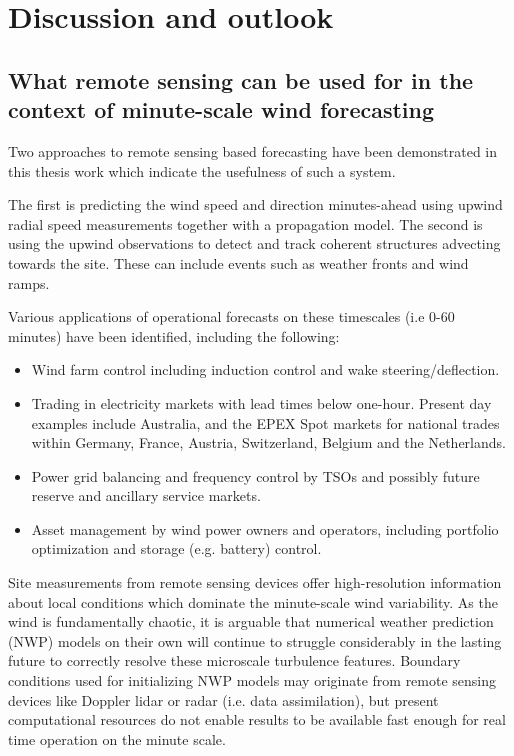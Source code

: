 \chapter{Discussion and outlook}
\label{sec:discussion}

\clearpage
\section{What remote sensing can be used for in the context of minute-scale wind forecasting}
\label{sec:discussion_rs}
\bigskip

Two approaches to remote sensing based forecasting have been demonstrated in this thesis work which indicate the usefulness of such a system.

The first is predicting the wind speed and direction minutes-ahead using upwind radial speed measurements together with a propagation model. The second is using the upwind observations to detect and track coherent structures advecting towards the site. These can include events such as weather fronts and wind ramps.

Various applications of operational forecasts on these timescales (i.e 0-60 minutes) have been identified, including the following:

\begin{itemize}
    \item Wind farm control including induction control and wake steering/deflection.
    \item Trading in electricity markets with lead times below one-hour. Present day examples include Australia, and the EPEX Spot markets for national trades within Germany, France, Austria, Switzerland, Belgium and the Netherlands.
    \item Power grid balancing and frequency control by TSOs and possibly future reserve and ancillary service markets.
    \item Asset management by wind power owners and operators, including portfolio optimization and storage (e.g. battery) control.
\end{itemize}

Site measurements from remote sensing devices offer high-resolution information about local conditions which dominate the minute-scale wind variability. As the wind is fundamentally chaotic, it is arguable that numerical weather prediction (NWP) models on their own will continue to struggle considerably in the lasting future to correctly resolve these microscale turbulence features. Boundary conditions used for initializing NWP models may originate from remote sensing devices like Doppler lidar or radar (i.e. data assimilation), but present computational resources do not enable results to be available fast enough for real time operation on the minute scale.

